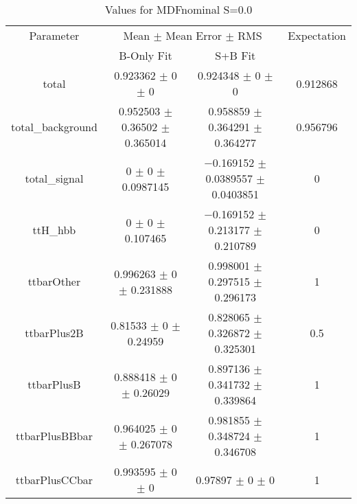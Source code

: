 \begin{table}
\centering
\caption{Values for MDFnominal S=0.0}
\begin{tabular}{cccc}
\toprule
Parameter & \multicolumn{2}{c}{Mean $\pm$ Mean Error $\pm$ RMS} & Expectation\\
 & B-Only Fit & S+B Fit & \\
\midrule
total & \num{0.923362} $\pm$ \num{0} $\pm$ \num{0} & \num{0.924348} $\pm$ \num{0} $\pm$ \num{0} & \num{0.912868}\\
total\_background & \num{0.952503} $\pm$ \num{0.36502} $\pm$ \num{0.365014} & \num{0.958859} $\pm$ \num{0.364291} $\pm$ \num{0.364277} & \num{0.956796}\\
total\_signal & \num{0} $\pm$ \num{0} $\pm$ \num{0.0987145} & \num{-0.169152} $\pm$ \num{0.0389557} $\pm$ \num{0.0403851} & \num{0}\\
ttH\_hbb & \num{0} $\pm$ \num{0} $\pm$ \num{0.107465} & \num{-0.169152} $\pm$ \num{0.213177} $\pm$ \num{0.210789} & \num{0}\\
ttbarOther & \num{0.996263} $\pm$ \num{0} $\pm$ \num{0.231888} & \num{0.998001} $\pm$ \num{0.297515} $\pm$ \num{0.296173} & \num{1}\\
ttbarPlus2B & \num{0.81533} $\pm$ \num{0} $\pm$ \num{0.24959} & \num{0.828065} $\pm$ \num{0.326872} $\pm$ \num{0.325301} & \num{0.5}\\
ttbarPlusB & \num{0.888418} $\pm$ \num{0} $\pm$ \num{0.26029} & \num{0.897136} $\pm$ \num{0.341732} $\pm$ \num{0.339864} & \num{1}\\
ttbarPlusBBbar & \num{0.964025} $\pm$ \num{0} $\pm$ \num{0.267078} & \num{0.981855} $\pm$ \num{0.348724} $\pm$ \num{0.346708} & \num{1}\\
ttbarPlusCCbar & \num{0.993595} $\pm$ \num{0} $\pm$ \num{0} & \num{0.97897} $\pm$ \num{0} $\pm$ \num{0} & \num{1}\\
\bottomrule
\end{tabular}
\end{table}